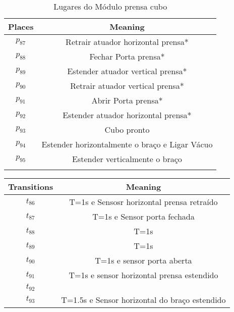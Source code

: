 \begin{table}[htbp]
\caption{Lugares do Módulo prensa cubo}
\centering
\begin{tabular}{c|c}
Places & Meaning\\
\hline
\hyperlink{partialNet:p87}{\hypertarget{partialTable:p87}{$p_{87}$}} & Retrair atuador horizontal prensa*\\
\hyperlink{partialNet:p88}{\hypertarget{partialTable:p88}{$p_{88}$}} & Fechar Porta prensa*\\
\hyperlink{partialNet:p89}{\hypertarget{partialTable:p89}{$p_{89}$}} & Estender atuador vertical prensa*\\
\hyperlink{partialNet:p90}{\hypertarget{partialTable:p90}{$p_{90}$}} & Retrair atuador vertical prensa*\\
\hyperlink{partialNet:p91}{\hypertarget{partialTable:p91}{$p_{91}$}} & Abrir Porta prensa*\\
\hyperlink{partialNet:p92}{\hypertarget{partialTable:p92}{$p_{92}$}} & Estender atuador horizontal prensa*\\
\hyperlink{partialNet:p93}{\hypertarget{partialTable:p93}{$p_{93}$}} & Cubo pronto\\
\hyperlink{partialNet:p94}{\hypertarget{partialTable:p94}{$p_{94}$}} & Estender horizontalmente o braço e Ligar Vácuo\\
\hyperlink{partialNet:p95}{\hypertarget{partialTable:p95}{$p_{95}$}} & Estender verticalmente o braço\\
 & \\
\end{tabular}
\end{table}

\begin{center}
\begin{tabular}{c|c}
Transitions & Meaning\\
\hline
\hyperlink{partialNet:tt86}{\hypertarget{partialTable:tt86}{$t_{86}$}} & T=1s e Sensosr horizontal prensa retraído\\
\hyperlink{partialNet:tt87}{\hypertarget{partialTable:tt87}{$t_{87}$}} & T=1s e Sensor porta fechada\\
\hyperlink{partialNet:tt88}{\hypertarget{partialTable:tt88}{$t_{88}$}} & T=1s\\
\hyperlink{partialNet:tt89}{\hypertarget{partialTable:tt89}{$t_{89}$}} & T=1s\\
\hyperlink{partialNet:tt90}{\hypertarget{partialTable:tt90}{$t_{90}$}} & T=1s e sensor porta aberta\\
\hyperlink{partialNet:tt91}{\hypertarget{partialTable:tt91}{$t_{91}$}} & T=1s e sensor horizontal prensa estendido\\
\hyperlink{partialNet:t92}{\hypertarget{partialTable:t92}{$t_{92}$}} & \\
\hyperlink{partialNet:tt93}{\hypertarget{partialTable:tt93}{$t_{93}$}} & T=1.5s e Sensor horizontal do braço estendido\\
\end{tabular}
\end{center}
